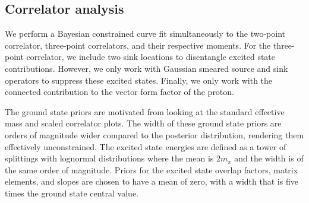 \documentclass{PoS}
\begin{document}
\subsection{Correlator analysis}
We perform a Bayesian constrained curve fit simultaneously to the two-point correlator, three-point correlators, and their respective moments. For the three-point correlator, we include two sink locations to disentangle excited state contributions. However, we only work with Gaussian smeared source and sink operators to suppress these excited states. Finally, we only work with the connected contribution to the vector form factor of the proton.

The ground state priors are motivated from looking at the standard effective mass and scaled correlator plots. The width of these ground state priors are orders of magnitude wider compared to the posterior distribution, rendering them effectively unconstrained. The excited state energies are defined as a tower of splittings with lognormal distributions where the mean is $2m_\pi$ and the width is of the same order of magnitude. Priors for the excited state overlap factors, matrix elements, and slopes are chosen to have a mean of zero, with a width that is five times the ground state central value.
\end{document}
